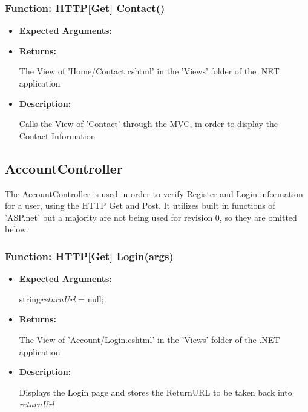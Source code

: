 \documentclass{scrreprt}
\begin{document}
\subsubsection{Function: HTTP[Get] Contact()}
\begin{itemize}
    \item \textbf{Expected Arguments:}
    \item \textbf{Returns:}

    The View of 'Home/Contact.cshtml' in the 'Views' folder of the .NET application

    \item \textbf{Description:}

    Calls the View of 'Contact' through the MVC, in order to display the Contact Information
\end{itemize}



\subsection{AccountController}
The AccountController is used in order to verify Register and Login information for a user, using the HTTP Get and Post. It utilizes built in functions of 'ASP.net' but a majority are not being used for revision 0, so they are omitted below.

\subsubsection{Function: HTTP[Get] Login(args)}
\begin{itemize}
    \item \textbf{Expected Arguments:}

    string\quad\textit{returnUrl} = null;

    \item \textbf{Returns:}

    The View of 'Account/Login.cshtml' in the 'Views' folder of the .NET application

    \item \textbf{Description:}

    Displays the Login page and stores the ReturnURL to be taken back into \textit{returnUrl}
\end{itemize}
\end{document}
